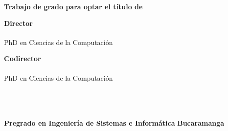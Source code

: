 \begin{titlepage}
    \begin{center}

        \textbf{\tit}

        \vspace{6em}

        \nam

        \vspace{5em}

        \textbf{Trabajo de grado para optar el título de \opta}

        \vspace{5em}

        \textbf{Director}\\
        \dir\\  PhD en Ciencias de la Computación

        \vspace{3em}
        
        \textbf{Codirector}\\
        \cdir\\ PhD en Ciencias de la Computación

        \vspace{4em}
        
        \textbf{\uni} \\
        \textbf{\fac} \\
        \textbf{\esc} \\
        \textbf{Pregrado en Ingeniería de Sistemas e Informática}
        \textbf{Bucaramanga} \\
        \textbf{\the\year}

    
   \end{center}
\end{titlepage}


